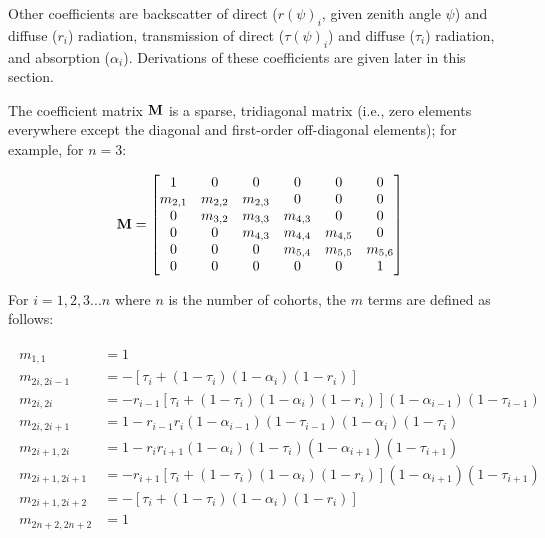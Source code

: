 Other coefficients are
backscatter of direct ($r(\psi)_{i}$, given zenith angle $\psi$) and diffuse ($r_{i}$) radiation,
transmission of direct ($\tau(\psi)_{i}$) and diffuse ($\tau_{i}$) radiation,
and absorption ($\alpha_{i}$).
Derivations of these coefficients are given later in this section.

The coefficient matrix $\mathbf{M}$ is a sparse, tridiagonal matrix (i.e., zero elements everywhere except the diagonal and first-order off-diagonal elements); for example, for $n=3$:

\begin{equation}
  \mathbf{M} = \begin{bmatrix}
    1 & 0 & 0 & 0 & 0 & 0 \\
    m_{2,1} & m_{2,2} & m_{2,3} & 0 & 0 & 0 \\
    0 & m_{3,2} & m_{3,3} & m_{4,3} & 0 & 0 \\
    0 & 0 & m_{4,3} & m_{4,4} & m_{4,5} & 0 \\
    0 & 0 & 0 & m_{5,4} & m_{5,5} & m_{5,6} \\
    0 & 0 & 0 & 0 & 0 & 1 \\
  \end{bmatrix}
\end{equation}

For $i = 1,2,3...n$ where $n$ is the number of cohorts, the $m$ terms are defined as follows:

\begin{align}
  \begin{split}
    m_{1,1} &= 1\\
    m_{2i,2i-1} &= - \left[ \tau_i + (1 - \tau_i)(1 - \alpha_i)(1 - r_i) \right]\\
    m_{2i,2i} &= -r_{i-1} \left[ \tau_i + (1 - \tau_i)(1 - \alpha_i)(1 - r_i) \right] (1 - \alpha_{i-1})(1 - \tau_{i-1})\\
    m_{2i,2i+1} &= 1 - r_{i-1} r_i (1 - \alpha_{i-1})(1 - \tau_{i-1})(1 - \alpha_i)(1 - \tau_i)\\
    m_{2i+1,2i} &= 1 - r_i r_{i+1} (1 - \alpha_i)(1 - \tau_i)(1 - \alpha_{i+1})(1 - \tau_{i+1})\\
    m_{2i+1,2i+1} &= -r_{i+1} \left[ \tau_i + (1 - \tau_i)(1 - \alpha_i)(1 - r_i) \right] (1 - \alpha_{i+1})(1 - \tau_{i+1})\\
    m_{2i+1,2i+2} &= - \left[ \tau_i + (1 - \tau_i)(1 - \alpha_i)(1 - r_i) \right]\\
    m_{2n+2,2n+2} &= 1
  \end{split}
\end{align}

